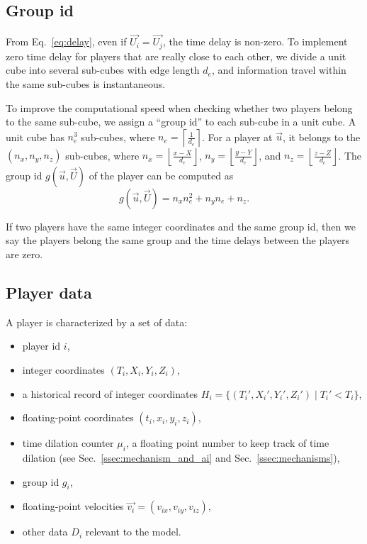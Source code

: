 \documentclass{svproc}
\begin{document}
\subsection{Group id}

From Eq.~\ref{eq:delay}, even if $\overrightarrow{U_i} = \overrightarrow{U_j}$, the time delay is non-zero.
To implement zero time delay for players that are really close to each other, 
we divide a unit cube into several sub-cubes with edge length $d_e$, 
and information travel within the same sub-cubes is instantaneous.

To improve the computational speed when checking whether two players belong to the same sub-cube,
we assign a ``group id'' to each sub-cube in a unit cube.
A unit cube has $n_e^3$ sub-cubes, where $n_e = \left \lceil \frac{1}{d_e} \right \rceil$.
For a player at $\overrightarrow{u}$, it belongs to the $(n_x, n_y, n_z)$ sub-cubes,
where $n_x = \left \lfloor \frac{x - X} {d_e} \right \rfloor$,
$n_y = \left \lfloor \frac{y - Y} {d_e} \right \rfloor$,
and $n_z = \left \lfloor \frac{z - Z} {d_e} \right \rfloor$.
The group id $g(\overrightarrow{u}, \overrightarrow{U})$ of the player
can be computed as
\begin{equation} \label{eq:group}
    g(\overrightarrow{u}, \overrightarrow{U}) = n_x n_e^2 + n_y n_e + n_z.
\end{equation}

If two players have the same integer coordinates and the same group id,
then we say the players belong the same group and the time delays between the players are zero.

\subsection{Player data}

A player is characterized by a set of data:
\begin{itemize}
  \item player id $i$,
  \item integer coordinates $(T_i, X_i, Y_i, Z_i)$,
  \item a historical record of integer coordinates $H_i = \{(T_i', X_i', Y_i', Z_i') \mid T_i' < T_i \}$,
  \item floating-point coordinates $(t_i, x_i, y_i, z_i)$,
  \item time dilation counter $\mu_i$, 
        a floating point number to keep track of time dilation (see Sec.~\ref{ssec:mechanism_and_ai} and Sec.~\ref{ssec:mechanisms}),
  \item group id $g_i$,
  \item floating-point velocities $\overrightarrow{v_i} = (v_{ix}, v_{iy}, v_{iz})$,
  \item other data $D_i$ relevant to the model.
\end{itemize}
\end{document}
